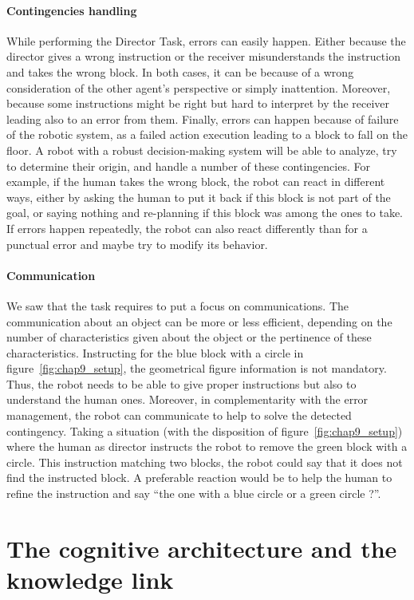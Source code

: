 \paragraph{Contingencies handling} While performing the Director Task, errors can easily happen. Either because the director gives a wrong instruction or the receiver misunderstands the instruction and takes the wrong block. In both cases, it can be because of a wrong consideration of the other agent's perspective or simply inattention. Moreover, because some instructions might be right but hard to interpret by the receiver leading also to an error from them. Finally, errors can happen because of failure of the robotic system, as a failed action execution leading to a block to fall on the floor. A robot with a robust decision-making system will be able to analyze, try to determine their origin, and handle a number of these contingencies. For example, if the human takes the wrong block, the robot can react in different ways, either by asking the human to put it back if this block is not part of the goal, or saying nothing and re-planning if this block was among the ones to take. If errors happen repeatedly, the robot can also react differently than for a punctual error and maybe try to modify its behavior.

\paragraph{Communication} We saw that the task requires to put a focus on communications. The communication about an object can be more or less efficient, depending on the number of characteristics given about the object or the pertinence of these characteristics. Instructing for the blue block with a circle in figure~\ref{fig:chap9_setup}, the geometrical figure information is not mandatory. Thus, the robot needs to be able to give proper instructions but also to understand the human ones. Moreover, in complementarity with the error management, the robot can communicate to help to solve the detected contingency. Taking a situation (with the disposition of figure~\ref{fig:chap9_setup}) where the human as director instructs the robot to remove the green block with a circle. This instruction matching two blocks, the robot could say that it does not find the instructed block. A preferable reaction would be to help the human to refine the instruction and say ``the one with a blue circle or a green circle ?''.

\section[Architecture and knowledge link]{The cognitive architecture and the knowledge link}
\label{sec:9_3}

